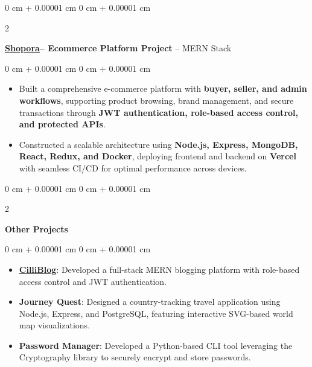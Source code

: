 \documentclass[10pt, letterpaper]{article}
\newenvironment{highlights}{
    \begin{itemize}[
        topsep=0.10 cm,
        parsep=0.10 cm,
        partopsep=0pt,
        itemsep=0pt,
        leftmargin=0 cm + 10pt
    ]
}{
    \end{itemize}
} %
\newenvironment{onecolentry}{
    \begin{adjustwidth}{
        0 cm + 0.00001 cm
    }{
        0 cm + 0.00001 cm
    }
}{
    \end{adjustwidth}
} %
\newenvironment{twocolentry}[2][]{
    \onecolentry
    \def\secondColumn{#2}
    \setcolumnwidth{\fill, 4.5 cm}
    \begin{paracol}{2}
}{
    \switchcolumn \raggedleft \secondColumn
    \end{paracol}
    \endonecolentry
} %
\begin{document}
        \vspace{0.2 cm}
        \begin{twocolentry}{
    \href{https://github.com/ritheshan/Shopora}{\faGithub}
}
    \textbf{\href{https://mern-store-gold.vercel.app/}{\underline{\textcolor{blueHighlight}{\large Shopora}}}– Ecommerce Platform Project} -- MERN Stack
\end{twocolentry}

\vspace{0.10 cm}
\begin{onecolentry}
    \begin{highlights}
        \item Built a comprehensive e-commerce platform with \textbf{buyer, seller, and admin workflows}, supporting product browsing, brand management, and secure transactions through \textbf{JWT authentication, role-based access control, and protected APIs}.  
        \item Constructed a scalable architecture using \textbf{Node.js, Express, MongoDB, React, Redux, and Docker}, deploying frontend and backend on \textbf{Vercel} with seamless CI/CD for optimal performance across devices.  
    \end{highlights}
\end{onecolentry}

        \begin{twocolentry}{
    \href{https://github.com/ritheshan}{\faGithub}
}
    \textbf {Other Projects}
\end{twocolentry}

\vspace{0.10 cm}
\begin{onecolentry}
    \begin{highlights}
        \item \textbf{\href{https://cilliblog.vercel.app/}{\underline{\textcolor{blueHighlight}{CilliBlog}}}}: Developed a full-stack MERN blogging platform with role-based access control and JWT authentication. 
        \item \textbf{\textcolor{blueHighlight}{Journey Quest}}: Designed a country-tracking travel application using Node.js, Express, and PostgreSQL, featuring interactive SVG-based world map visualizations.
        \item \textbf{\textcolor{blueHighlight}{Password Manager}}: Developed a Python-based CLI tool leveraging the Cryptography library to securely encrypt and store passwords.
    \end{highlights}
\end{onecolentry}
\end{document}
